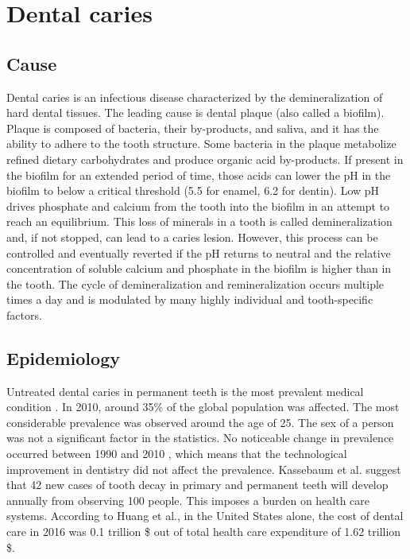 \section{Dental caries}

\subsection{Cause}
Dental caries is an infectious disease characterized by the demineralization of hard dental tissues. The leading cause is dental plaque (also called a biofilm). Plaque is composed of bacteria, their by-products, and saliva, and it has the ability to adhere to the tooth structure. Some bacteria in the plaque metabolize refined dietary carbohydrates and produce organic acid by-products. If present in the biofilm for an extended period of time, those acids can lower the pH in the biofilm to below a critical threshold (5.5 for enamel, 6.2 for dentin)\cite{2019a}. Low pH drives phosphate and calcium from the tooth into the biofilm in an attempt to reach an equilibrium. This loss of minerals in a tooth is called demineralization and, if not stopped, can lead to a caries lesion. However, this process can be controlled and eventually reverted if the pH returns to neutral and the relative concentration of soluble calcium and phosphate in the biofilm is higher than in the tooth. The cycle of demineralization and remineralization occurs multiple times a day and is modulated by many highly individual and tooth-specific factors.

\subsection{Epidemiology}
Untreated dental caries in permanent teeth is the most prevalent medical condition \cite{Kassebaum2015}. In 2010, around 35\% of the global population was affected. The most considerable prevalence was observed around the age of 25. The sex of a person was not a significant factor in the statistics. No noticeable change in prevalence occurred between 1990 and 2010 \cite{Kassebaum2015} \cite{Frencken2017}, which means that the technological improvement in dentistry did not affect the prevalence.
Kassebaum et al. suggest that 42 new cases of tooth decay in primary and permanent teeth will develop annually from observing 100 people. This imposes a burden on health care systems. According to Huang et al., \cite{Hung2020} in the United States alone, the cost of dental care in 2016 was 0.1 trillion \$ out of total health care expenditure of 1.62 trillion \$.

